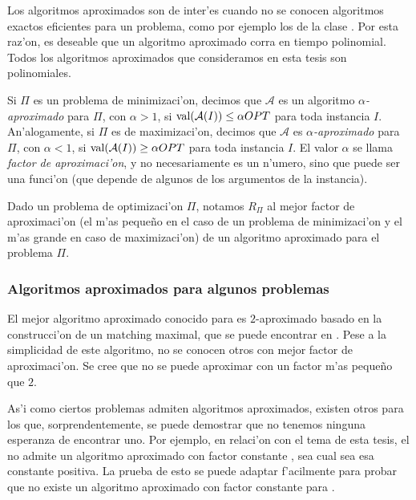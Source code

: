 Los algoritmos aproximados son de inter'es cuando no se conocen algoritmos exactos eficientes para un problema, como por ejemplo los de la clase . Por esta raz'on, es deseable que un algoritmo aproximado corra en tiempo polinomial. Todos los algoritmos aproximados que consideramos en esta tesis son polinomiales.

Si $\Pi$ es un problema de minimizaci'on, decimos que $\mathcal{A}$ es un algoritmo \textit{$\alpha$-aproximado} para $\Pi$, con $\alpha > 1$, si $\textnormal{val}(\mathcal{A}(I)) \leq \alpha OPT$ para toda instancia $I$. An'alogamente, si $\Pi$ es de maximizaci'on, decimos que $\mathcal{A}$ es \textit{$\alpha$-aproximado} para $\Pi$, con $\alpha < 1$, si $\textnormal{val}(\mathcal{A}(I)) \geq \alpha OPT$ para toda instancia $I$. El valor $\alpha$ se llama \textit{factor de aproximaci'on}, y no necesariamente es un n'umero, sino que puede ser una funci'on (que depende de algunos de los argumentos de la instancia).

Dado un problema de optimizaci'on $\Pi$, notamos $R_{\Pi}$ al mejor factor de aproximaci'on (el m'as peque\~no en el caso de un problema de minimizaci'on y el m'as grande en caso de maximizaci'on) de un algoritmo aproximado para el problema $\Pi$.

\subsubsection*{Algoritmos aproximados para algunos problemas}

El mejor algoritmo aproximado conocido para  es $2$-aproximado basado en la construcci'on de un matching maximal, que se puede encontrar en \cite[p. 134]{Ga79}. Pese a la simplicidad de este algoritmo, no se conocen otros con mejor factor de aproximaci'on. Se cree que  no se puede aproximar con un factor m'as peque\~no que $2$.

As'i como ciertos problemas admiten algoritmos aproximados, existen otros para los que, sorprendentemente, se puede demostrar que no tenemos ninguna esperanza de encontrar uno. Por ejemplo, en relaci'on con el tema de esta tesis, el  no admite un algoritmo aproximado con factor constante \cite[p. 147]{Ga76}, sea cual sea esa constante positiva. La prueba de esto se puede adaptar f'acilmente para probar que no existe un algoritmo aproximado con factor constante para .

